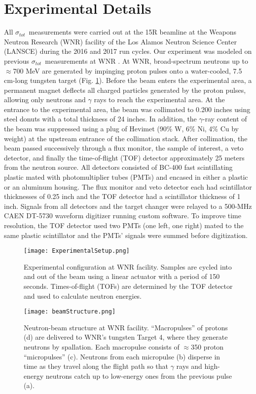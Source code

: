 \documentclass[twocolumn,secnumarabic,amssymb, nobibnotes, aps, prl,
superscriptaddress, nobalancelastpage, floatfix]{revtex4}
\newcommand{\tot}{\ensuremath{\sigma_{tot}}}
\begin{document}
\section{Experimental Details}
All \tot\ measurements were carried out at the 15R
beamline at the Weapons Neutron Research (WNR) facility of the Los Alamos
Neutron Science Center (LANSCE) during the 2016 and
2017 run cycles. Our experiment was modeled on previous
\tot\ measurements at WNR \cite{Finlay1993,Abfalterer2001,Shane2010}.
At WNR,
broad-spectrum neutrons up
to $\approx$700 MeV are generated by impinging proton pulses onto a water-cooled, 7.5
cm-long tungsten target (Fig. \ref{ExperimentalApparatus}). Before the beam
enters the experimental area, a
permanent magnet deflects all charged particles generated by the proton pulses, 
allowing only neutrons and $\gamma$ rays to reach the experimental area. At the
entrance to the experimental area, the beam was collimated to 0.200 inches using steel
donuts with a total thickness of 24 inches. In addition, the $\gamma$-ray content of the beam
was suppressed using a plug of Hevimet (90\% W, 6\% Ni, 4\% Cu by weight)
at the upstream entrance of the collimation stack.
After collimation, the beam passed successively through a flux 
monitor, the sample of interest, a veto detector, and finally the 
time-of-flight (TOF) detector approximately 25 meters from the neutron source.
All detectors consisted of BC-400 fast scintillating plastic mated with 
photomultiplier tubes (PMTs) and encased in either a plastic or
an aluminum housing. The flux monitor and veto detector each had
scintillator thicknesses of 0.25 inch and the TOF detector had a
scintillator thickness of 1 inch. Signals from all detectors and
the target changer were relayed to a 500-MHz CAEN DT-5730 waveform digitizer
running custom software. To improve time resolution, the TOF detector used two
PMTs (one left, one right) mated to the same plastic scintillator and the PMTs' signals were 
summed before digitization.

\begin{figure}
    \texttt{[image: ExperimentalSetup.png]}
    \caption{Experimental configuration at WNR facility.
        Samples are cycled into and out of the beam
        using a linear actuator with a period of 150 seconds. Times-of-flight (TOFs) are
    determined by the TOF detector and used to calculate neutron energies.}
    \label{ExperimentalApparatus}
\end{figure}

\begin{figure}
    \texttt{[image: beamStructure.png]}
    \caption{Neutron-beam structure at WNR facility.
        ``Macropulses'' of protons (d) are delivered to
        WNR's tungsten Target 4, where they generate neutrons by spallation.
        Each macropulse consists of
        $\approx$350 proton ``micropulses'' (c). Neutrons
        from each micropulse (b) disperse in
        time as they travel along the flight path so that $\gamma$ rays and high-energy 
    neutrons catch up to low-energy ones from the previous pulse (a).}
    \label{BeamStructure}
\end{figure}
\end{document}
